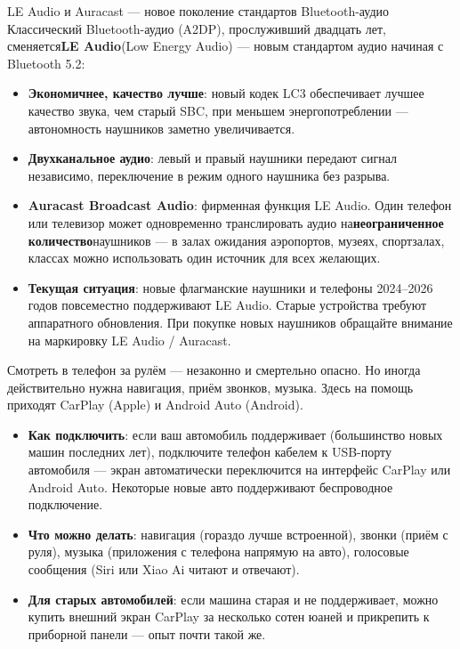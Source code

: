 \begin{tcbinfo}{LE Audio и Auracast — новое поколение стандартов Bluetooth-аудио}
Классический Bluetooth-аудио (A2DP), прослуживший двадцать лет, сменяется\textbf{LE Audio}(Low Energy Audio) — новым стандартом аудио начиная с Bluetooth 5.2:

\begin{itemize}
  \item \textbf{Экономичнее, качество лучше}: новый кодек LC3 обеспечивает лучшее качество звука, чем старый SBC, при меньшем энергопотреблении — автономность наушников заметно увеличивается.
  \item \textbf{Двухканальное аудио}: левый и правый наушники передают сигнал независимо, переключение в режим одного наушника без разрыва.
  \item \textbf{Auracast Broadcast Audio}: фирменная функция LE Audio. Один телефон или телевизор может одновременно транслировать аудио на\textbf{неограниченное количество}наушников — в залах ожидания аэропортов, музеях, спортзалах, классах можно использовать один источник для всех желающих.
  \item \textbf{Текущая ситуация}: новые флагманские наушники и телефоны 2024–2026 годов повсеместно поддерживают LE Audio. Старые устройства требуют аппаратного обновления. При покупке новых наушников обращайте внимание на маркировку LE Audio / Auracast.
\end{itemize}

\end{tcbinfo}


Смотреть в телефон за рулём — незаконно и смертельно опасно. Но иногда действительно нужна навигация, приём звонков, музыка. Здесь на помощь приходят CarPlay (Apple) и Android Auto (Android).

\begin{itemize}
  \item \textbf{Как подключить}: если ваш автомобиль поддерживает (большинство новых машин последних лет), подключите телефон кабелем к USB-порту автомобиля — экран автоматически переключится на интерфейс CarPlay или Android Auto. Некоторые новые авто поддерживают беспроводное подключение.
  \item \textbf{Что можно делать}: навигация (гораздо лучше встроенной), звонки (приём с руля), музыка (приложения с телефона напрямую на авто), голосовые сообщения (Siri или Xiao Ai читают и отвечают).
  \item \textbf{Для старых автомобилей}: если машина старая и не поддерживает, можно купить внешний экран CarPlay за несколько сотен юаней и прикрепить к приборной панели — опыт почти такой же.
\end{itemize}

